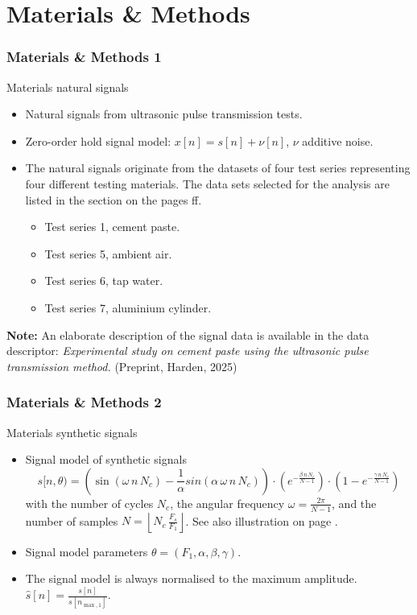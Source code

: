 	\section{Materials \& Methods}
	\begin{frame}
		\frametitle{Materials \& Methods 1}
		\textcolor{RIPtitlecol}{Materials \textendash{} natural signals}
		\begin{itemize}
			\setlength\itemsep{0.5em}
			\item Natural signals from ultrasonic pulse transmission tests.
			\item Zero-order hold signal model: $x[n] = s[n] + \nu[n]$, $\nu$ \textellipsis{} additive noise.
			\item The natural signals originate from the datasets of four test series representing four different testing materials. The data sets selected for the analysis are listed in the \appendixname{} section on the pages \pageref{app:dataset:ts1}ff.
			\begin{itemize}
				\item Test series 1, cement paste\autocite{ts1data}.
				\item Test series 5, ambient air\autocite{ts5data}.
				\item Test series 6, tap water\autocite{ts6data}.
				\item Test series 7, aluminium cylinder\autocite{ts7data}.
			\end{itemize}
		\end{itemize}
		\small \textbf{Note:} An elaborate description of the signal data is available in the data descriptor\autocite{expstudyharden2025}: \textsl{Experimental study on cement paste using the ultrasonic pulse transmission method.} (Preprint, Harden, 2025)
	\end{frame}

	\begin{frame}
		\frametitle{Materials \& Methods 2}
		\textcolor{RIPtitlecol}{Materials \textendash{} synthetic signals}
		\begin{itemize}
			\setlength\itemsep{0.1em}
			\item Signal model of synthetic signals
			\begin{equation}
				s[n,\theta) =
				\left(
				\sin(\omega \, n \, N_c) -
				\frac{1}{\alpha} sin(\alpha \, \omega \, n \, N_c)
				\right) \cdot
				\left( e^{-\frac{\beta \, n \, N_c}{N - 1}} \right) \cdot 
				\left( 1 - e^{-\frac{\gamma \, n \, N_c}{N - 1}} \right) \label{eq:sigmoddef}
			\end{equation}
			with the number of cycles $N_c$, the angular frequency $\omega = \frac{2 \pi}{N - 1}$, and the number of samples $N = \left\lfloor N_c \, \frac{F_s}{F_1} \right\rfloor$. See also illustration on page \pageref{mm:sigmodplot}.
			\item Signal model parameters $\theta = (F_1, \alpha, \beta, \gamma)$.
			\item The signal model is always normalised to the maximum amplitude. $\hat{s}[n] = \frac{s[n]}{s[n_{\max,1}]}$.
		\end{itemize}
	\end{frame}

